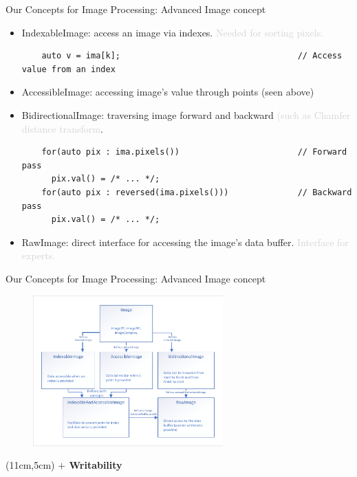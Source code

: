 \documentclass[12pt,aspectratio=169]{beamer}
\newcommand{\GRAYOUT}[1]{\textcolor{lightgray}{#1}}%
\begin{document}
\begin{frame}[fragile]{Our Concepts for Image Processing: Advanced Image concept}
  \begin{itemize}
    \item IndexableImage: access an image via indexes. \GRAYOUT{Needed for sorting pixels.}
          \begin{verbatim}
    auto v = ima[k];                                    // Access value from an index
    \end{verbatim}
    \item AccessibleImage: accessing image's value through points (seen above)
    \item BidirectionalImage: traversing image forward and backward \GRAYOUT{(such as Chamfer distance transform}.
          \begin{verbatim}
    for(auto pix : ima.pixels())                        // Forward pass
      pix.val() = /* ... */;
    for(auto pix : reversed(ima.pixels()))              // Backward pass
      pix.val() = /* ... */;
    \end{verbatim}
    \item RawImage: direct interface for accessing the image's data buffer. \GRAYOUT{Interface for experts.}
  \end{itemize}
\end{frame}

\begin{frame}[fragile]{Our Concepts for Image Processing: Advanced Image concept}
  \begin{figure}
    \flushleft
    \includegraphics[width=0.65\textwidth]{../figures/concepts/images_all_rework}
  \end{figure}
  \begin{textblock*}{4cm}(11cm,5cm)
    \Large\textbf{\(+\) Writability}
  \end{textblock*}
\end{frame}
\end{document}
